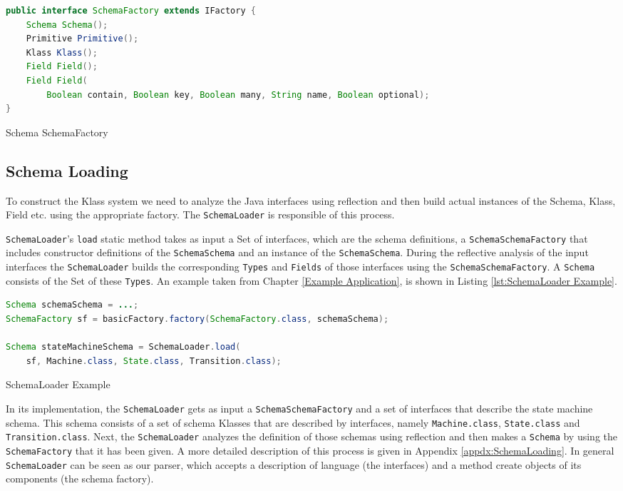\begin{sourcecode} [H]
	\begin{lstlisting}[language=Java, escapechar=|]
public interface SchemaFactory extends IFactory {
    Schema Schema();
    Primitive Primitive();
    Klass Klass();
    Field Field();
    Field Field(
    	Boolean contain, Boolean key, Boolean many, String name, Boolean optional);
}
	\end{lstlisting}
	\caption{Schema SchemaFactory}
	\label{lst:SchemaSchemaFactory}
\end{sourcecode}

\subsection{Schema Loading}\label{sec:Schema Loading}
To construct the Klass system we need to analyze the Java interfaces using reflection and then build actual instances of the Schema, Klass, Field etc. using the appropriate factory.
The \texttt{SchemaLoader} is responsible of this process.

\texttt{SchemaLoader}'s \texttt{load} static method takes as input a Set of interfaces, which are the schema definitions, a \texttt{SchemaSchemaFactory} that includes constructor definitions of the \texttt{SchemaSchema} and an instance of the \texttt{SchemaSchema}.
During the reflective analysis of the input interfaces the \texttt{SchemaLoader} builds the corresponding \texttt{Types} and \texttt{Fields} of those interfaces using the \texttt{SchemaSchemaFactory}.
A \texttt{Schema} consists of the Set of these \texttt{Types}.
An example taken from Chapter \ref{Example Application}, is shown in Listing \ref{lst:SchemaLoader Example}.

\begin{sourcecode} [H]
	\begin{lstlisting}[language=Java, escapechar=|]
Schema schemaSchema = ...;
SchemaFactory sf = basicFactory.factory(SchemaFactory.class, schemaSchema);

Schema stateMachineSchema = SchemaLoader.load(
	sf, Machine.class, State.class, Transition.class);
	\end{lstlisting}
	\caption{SchemaLoader Example}
	\label{lst:SchemaLoader Example}
\end{sourcecode}

In its implementation, the \texttt{SchemaLoader} gets as input a \texttt{SchemaSchemaFactory} and a set of interfaces that describe the state machine schema.
This schema consists of a set of schema Klasses that are described by interfaces, namely \texttt{Machine.class}, \texttt{State.class} and \texttt{Transition.class}.
Next, the \texttt{SchemaLoader} analyzes the definition of those schemas using reflection and then makes a \texttt{Schema} by using the \texttt{SchemaFactory} that it has been given.
A more detailed description of this process is given in Appendix \ref{appdx:SchemaLoading}.
In general \texttt{SchemaLoader} can be seen as our parser, which accepts a description of language (the interfaces) and a method create objects of its components (the schema factory).

